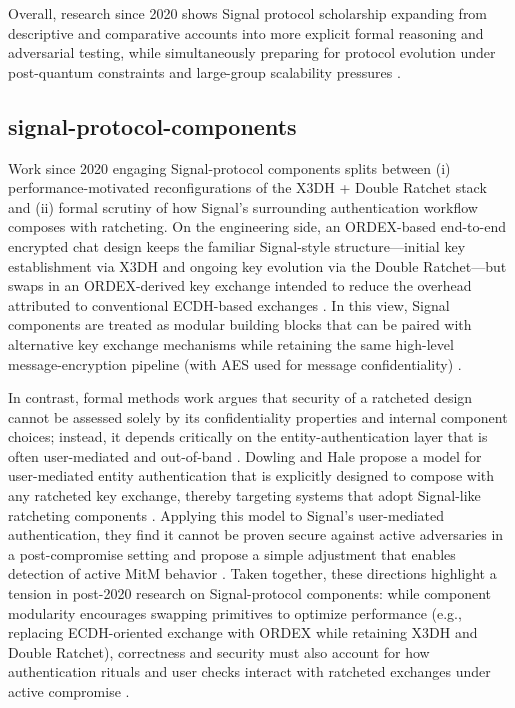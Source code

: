 Overall, research since 2020 shows Signal protocol scholarship expanding from descriptive and comparative accounts into more explicit formal reasoning and adversarial testing, while simultaneously preparing for protocol evolution under post-quantum constraints and large-group scalability pressures \cite{vladimirovich2020,kamkuemah2021,jain2021,oppliger2024,angom2025}.

\subsection{signal-protocol-components}
Work since 2020 engaging Signal-protocol components splits between (i) performance-motivated reconfigurations of the X3DH + Double Ratchet stack and (ii) formal scrutiny of how Signal’s surrounding authentication workflow composes with ratcheting. On the engineering side, an ORDEX-based end-to-end encrypted chat design keeps the familiar Signal-style structure—initial key establishment via X3DH and ongoing key evolution via the Double Ratchet—but swaps in an ORDEX-derived key exchange intended to reduce the overhead attributed to conventional ECDH-based exchanges \cite{m2024}. In this view, Signal components are treated as modular building blocks that can be paired with alternative key exchange mechanisms while retaining the same high-level message-encryption pipeline (with AES used for message confidentiality) \cite{m2024}.

In contrast, formal methods work argues that security of a ratcheted design cannot be assessed solely by its confidentiality properties and internal component choices; instead, it depends critically on the entity-authentication layer that is often user-mediated and out-of-band \cite{dowling2021}. Dowling and Hale propose a model for user-mediated entity authentication that is explicitly designed to compose with any ratcheted key exchange, thereby targeting systems that adopt Signal-like ratcheting components \cite{dowling2021}. Applying this model to Signal’s user-mediated authentication, they find it cannot be proven secure against active adversaries in a post-compromise setting and propose a simple adjustment that enables detection of active MitM behavior \cite{dowling2021}. Taken together, these directions highlight a tension in post-2020 research on Signal-protocol components: while component modularity encourages swapping primitives to optimize performance (e.g., replacing ECDH-oriented exchange with ORDEX while retaining X3DH and Double Ratchet), correctness and security must also account for how authentication rituals and user checks interact with ratcheted exchanges under active compromise \cite{m2024,dowling2021}.

